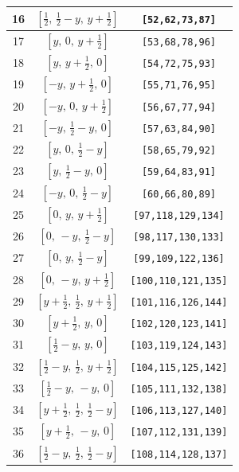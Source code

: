 \documentclass[fleqn,8pt]{jsarticle}
\begin{document}
\begin{longtable}{ccc}
16 & $\left[ \frac{1}{2},\, \frac{1}{2} - y,\, y + \frac{1}{2} \right]$ & {\tt [52,62,73,87]} \\ \hline
17 & $\left[ y,\, 0,\, y + \frac{1}{2} \right]$ & {\tt [53,68,78,96]} \\ \hline
18 & $\left[ y,\, y + \frac{1}{2},\, 0 \right]$ & {\tt [54,72,75,93]} \\ \hline
19 & $\left[ - y,\, y + \frac{1}{2},\, 0 \right]$ & {\tt [55,71,76,95]} \\ \hline
20 & $\left[ - y,\, 0,\, y + \frac{1}{2} \right]$ & {\tt [56,67,77,94]} \\ \hline
21 & $\left[ - y,\, \frac{1}{2} - y,\, 0 \right]$ & {\tt [57,63,84,90]} \\ \hline
22 & $\left[ y,\, 0,\, \frac{1}{2} - y \right]$ & {\tt [58,65,79,92]} \\ \hline
23 & $\left[ y,\, \frac{1}{2} - y,\, 0 \right]$ & {\tt [59,64,83,91]} \\ \hline
24 & $\left[ - y,\, 0,\, \frac{1}{2} - y \right]$ & {\tt [60,66,80,89]} \\ \hline
25 & $\left[ 0,\, y,\, y + \frac{1}{2} \right]$ & {\tt [97,118,129,134]} \\ \hline
26 & $\left[ 0,\, - y,\, \frac{1}{2} - y \right]$ & {\tt [98,117,130,133]} \\ \hline
27 & $\left[ 0,\, y,\, \frac{1}{2} - y \right]$ & {\tt [99,109,122,136]} \\ \hline
28 & $\left[ 0,\, - y,\, y + \frac{1}{2} \right]$ & {\tt [100,110,121,135]} \\ \hline
29 & $\left[ y + \frac{1}{2},\, \frac{1}{2},\, y + \frac{1}{2} \right]$ & {\tt [101,116,126,144]} \\ \hline
30 & $\left[ y + \frac{1}{2},\, y,\, 0 \right]$ & {\tt [102,120,123,141]} \\ \hline
31 & $\left[ \frac{1}{2} - y,\, y,\, 0 \right]$ & {\tt [103,119,124,143]} \\ \hline
32 & $\left[ \frac{1}{2} - y,\, \frac{1}{2},\, y + \frac{1}{2} \right]$ & {\tt [104,115,125,142]} \\ \hline
33 & $\left[ \frac{1}{2} - y,\, - y,\, 0 \right]$ & {\tt [105,111,132,138]} \\ \hline
34 & $\left[ y + \frac{1}{2},\, \frac{1}{2},\, \frac{1}{2} - y \right]$ & {\tt [106,113,127,140]} \\ \hline
35 & $\left[ y + \frac{1}{2},\, - y,\, 0 \right]$ & {\tt [107,112,131,139]} \\ \hline
36 & $\left[ \frac{1}{2} - y,\, \frac{1}{2},\, \frac{1}{2} - y \right]$ & {\tt [108,114,128,137]} \\ \hline

\end{longtable}
\end{document}
